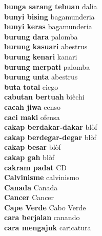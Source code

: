 \textbf{ bunga sarang tebuan  } dalia \\
\textbf{ bunyi bising  } bagamunderia \\
\textbf{ bunyi keras  } bagamunderia \\
\textbf{ burung dara  } palomba \\
\textbf{ burung kasuari  } abestrus \\
\textbf{ burung kenari  } kanari \\
\textbf{ burung merpati  } palomba \\
\textbf{ burung unta  } abestrus \\
\textbf{ buta total  } ciego \\
\textbf{ cabutan bertuah  } bièchi \\
\textbf{ cacah jiwa  } censo \\
\textbf{ caci maki  } ofensa \\
\textbf{ cakap berdakar-dakar  } blòf \\
\textbf{ cakap berdegar-degar  } blòf \\
\textbf{ cakap besar  } blòf \\
\textbf{ cakap gah  } blòf \\
\textbf{ cakram padat  } CD \\
\textbf{ Calvinisme  } calvinismo \\
\textbf{ Canada  } Canada \\
\textbf{ Cancer  } Cancer \\
\textbf{ Cape Verde  } Cabo Verde \\
\textbf{ cara berjalan  } canando \\
\textbf{ cara mengajuk  } caricatura \\
